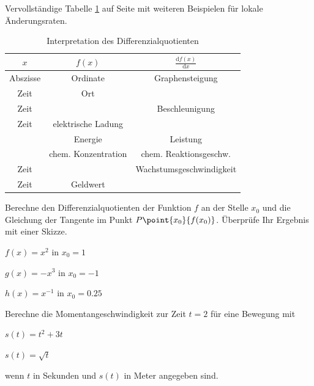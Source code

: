 \documentclass[%
11pt,%
twoside,%
titlepage,%
german,%
headsepline%
]{scrartcl}
\newcommand{\spaltenheight}{\rule{0mm}{3ex}}
\newcommand{\spaltensep}{\\[1ex]}
\begin{document}
\begin{ueb}[\"Anderungsraten]
Vervollst\"andige Tabelle \ref{tab:interpretation} auf Seite \pageref{tab:interpretation} mit weiteren Beispielen f\"ur lokale \"Anderungsraten.

\begin{table}
\normalsize
\begin{center}
\begin{tabular}{|c|c|c|}
\hline
\spaltenheight $x$ & $f(x)$ & $\frac{\mathrm{d}f(x)}{\mathrm{d}x}$ \spaltensep\hline
\spaltenheight Abszisse & Ordinate & Graphensteigung \spaltensep\hline
\spaltenheight Zeit & Ort & \spaltensep\hline
\spaltenheight Zeit & & Beschleunigung \spaltensep\hline
\spaltenheight Zeit & elektrische Ladung & \spaltensep\hline
\spaltenheight  & Energie & Leistung \spaltensep\hline
\spaltenheight  & chem. Konzentration & chem. Reaktionsgeschw.\spaltensep\hline
\spaltenheight  Zeit & & Wachstumsgeschwindigkeit \spaltensep\hline
\spaltenheight  Zeit & Geldwert & \spaltensep\hline
\end{tabular}
\end{center}
\caption{Interpretation des Differenzialquotienten}\label{tab:interpretation}
\end{table}
\end{ueb}

\begin{ueb}[Differenzialquotient]\label{uebtangente}
Berechne
den Differenzialquotienten der Funktion $f$ an der Stelle $x_0$ und die Gleichung der Tangente im Punkt $P\point{x_0}{f(x_0)}$. \"Uberpr\"ufe Ihr Ergebnis mit einer Skizze.
\begin{enumeratea}
\item $f(x)=x^2$ in $x_0=1$
\item $g(x)=-x^3$ in $x_0=-1$
\item $h(x)=x^{-1}$ in $x_0=0.25$
\end{enumeratea}
\end{ueb}

\begin{ueb}[Momentangeschwindigkeit]\label{uebmomentangeschw}
Berechne
die Momentangeschwindigkeit zur Zeit $t=2$ f\"ur eine Bewegung mit

\begin{minipage}{3.5cm}
\begin{enumeratea}
\item $s(t)=t^2+3t$
\end{enumeratea}
\end{minipage}
\begin{minipage}{3.5cm}
\begin{enumeratea}
\addtocounter{enumi}{1}
\item $s(t)=\sqrt{t}$
\end{enumeratea}
\end{minipage}

wenn $t$ in Sekunden und $s(t)$ in Meter angegeben sind.
\end{ueb}
\end{document}
